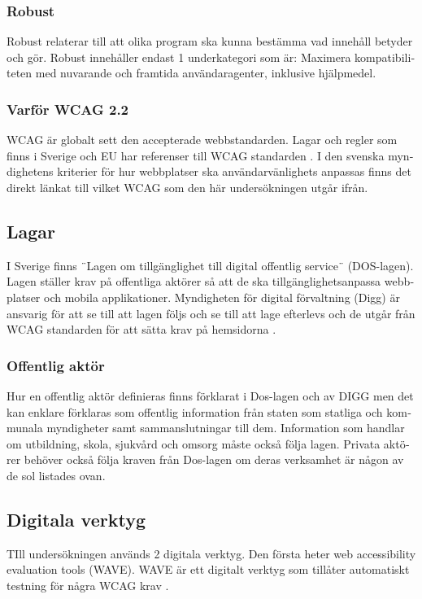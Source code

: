 \documentclass[11p]{article}
\begin{document}
\begin{otherlanguage}{swedish}
    \subsubsection{Robust}
    Robust relaterar till att olika program ska kunna bestämma vad innehåll betyder och gör.
    Robust innehåller endast 1 underkategori som är:
    Maximera kompatibiliteten med nuvarande och framtida användaragenter, inklusive hjälpmedel.

    \subsubsection{Varför WCAG 2.2}
    WCAG är globalt sett den accepterade webbstandarden.
    Lagar och regler som finns i Sverige och EU har referenser till WCAG standarden \parencite{Utförande_av_Dos_lagen}.
    I den svenska myndighetens kriterier för hur webbplatser ska användarvänlighets anpassas finns det direkt länkat till vilket WCAG som den här undersökningen utgår ifrån. \parencite{Utförande_av_Dos_lagen}


    \subsection{Lagar}
    I Sverige finns ¨Lagen om tillgänglighet till digital offentlig service¨ (DOS-lagen)\parencite{Dos-lagen}.
    Lagen ställer krav på offentliga aktörer så att de ska tillgänglighetsanpassa webbplatser och mobila applikationer.
    Myndigheten för digital förvaltning (Digg) är ansvarig för att se till att lagen följs och se till att lage efterlevs och de utgår från WCAG standarden för att sätta krav på hemsidorna \parencite{Utförande_av_Dos_lagen}. %

    \subsubsection{Offentlig aktör}
    Hur en offentlig aktör definieras finns förklarat i Dos-lagen \parencite{Dos-lagen} och av DIGG \parencite{Om_Dos-lagen} men det kan enklare förklaras som offentlig information från staten som statliga och kommunala myndigheter samt sammanslutningar till dem.
    Information som handlar om utbildning, skola, sjukvård och omsorg måste också följa lagen.
    Privata aktörer behöver också följa kraven från Dos-lagen om deras verksamhet är någon av de sol listades ovan.

    \subsection{Digitala verktyg}
    TIll undersökningen används 2 digitala verktyg.
    Den första heter web accessibility evaluation tools (WAVE).
    WAVE är ett digitalt verktyg som tillåter automatiskt testning för några WCAG krav \parencite{WAVE}.


\end{otherlanguage}
\end{document}
